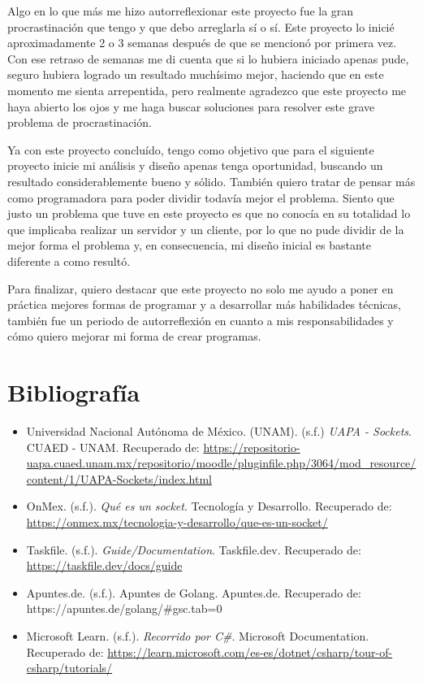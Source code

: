 \documentclass{article}
\begin{document}
Algo en lo que más me hizo autorreflexionar este proyecto fue la gran procrastinación que tengo y que debo arreglarla sí o sí. Este proyecto lo inicié aproximadamente 2 o 3 semanas después de que se mencionó por primera vez. Con ese retraso de semanas me di cuenta que si lo hubiera iniciado apenas pude, seguro hubiera logrado un resultado muchísimo mejor, haciendo que en este momento me sienta arrepentida, pero realmente agradezco que este proyecto me haya abierto los ojos y me haga buscar soluciones para resolver este grave problema de procrastinación.

Ya con este proyecto concluído, tengo como objetivo que para el siguiente proyecto inicie mi análisis y diseño apenas tenga oportunidad, buscando un resultado considerablemente bueno y sólido. También quiero tratar de pensar más como programadora para poder dividir todavía mejor el problema. Siento que justo un problema que tuve en este proyecto es que no conocía en su totalidad lo que implicaba realizar un servidor y un cliente, por lo que no pude dividir de la mejor forma el problema y, en consecuencia, mi diseño inicial es bastante diferente a como resultó.

Para finalizar, quiero destacar que este proyecto no solo me ayudo a poner en práctica mejores formas de programar y a desarrollar más habilidades técnicas, también fue un periodo de autorreflexión en cuanto a mis responsabilidades y cómo quiero mejorar mi forma de crear programas. 

\section{Bibliografía}

\begin{itemize}
  \item Universidad Nacional Autónoma de México. (UNAM). (s.f.)  \emph{UAPA - Sockets}. CUAED - UNAM. Recuperado de: \url{https://repositorio-uapa.cuaed.unam.mx/repositorio/moodle/pluginfile.php/3064/mod_resource/content/1/UAPA-Sockets/index.html}
  \item OnMex. (s.f.). \emph{Qué es un socket}. Tecnología y Desarrollo. Recuperado de: \url{https://onmex.mx/tecnologia-y-desarrollo/que-es-un-socket/}
  \item Taskfile. (s.f.). \emph{Guide/Documentation}. Taskfile.dev. Recuperado de: \url{https://taskfile.dev/docs/guide}
  \item Apuntes.de. (s.f.). Apuntes de Golang. Apuntes.de. Recuperado de: https://apuntes.de/golang/#gsc.tab=0
  \item Microsoft Learn. (s.f.). \emph{Recorrido por C\#}. Microsoft Documentation. Recuperado de: \url{https://learn.microsoft.com/es-es/dotnet/csharp/tour-of-csharp/tutorials/}
\end{itemize}
\end{document}
